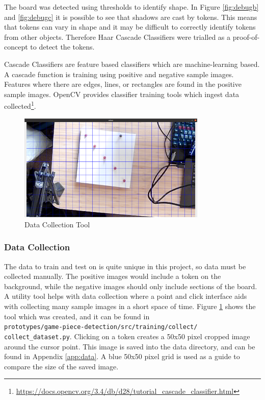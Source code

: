 \documentclass[12pt]{article}
\begin{document}
The board was detected using thresholds to identify shape. 
In Figure \ref{fig:debugb} and \ref{fig:debugc} it is possible to see that shadows are cast by tokens. 
This means that tokens can vary in shape and it may be difficult to correctly identify tokens from other objects. 
Therefore Haar Cascade Classifiers were trialled as a proof-of-concept to detect the tokens. 

Cascade Classifiers are feature based classifiers which are machine-learning based. 
A cascade function is training using positive and negative sample images. 
Features where there are edges, lines, or rectangles are found in the positive sample images. 
OpenCV provides classifier training tools which ingest data collected\footnote{\url{https://docs.opencv.org/3.4/db/d28/tutorial_cascade_classifier.html}}.

\begin{figure}[h]
    \centering
    \includegraphics[width=0.8\textwidth]{images/figures/fig11}
    \caption{Data Collection Tool}
    \label{fig:collect}
\end{figure}

\subsubsection{Data Collection}
The data to train and test on is quite unique in this project, so data must be collected manually. 
The positive images would include a token on the background, while the negative images should only include sections of the board. 
A utility tool helps with data collection where a point and click interface aids with collecting many sample images in a short space of time. 
Figure \ref{fig:collect} shows the tool which was created, and it can be found in\\
\texttt{prototypes/game-piece-detection/src/training/collect/\\collect\_dataset.py}. 
Clicking on a token creates a 50x50 pixel cropped image around the cursor point. 
This image is saved into the data directory, and can be found in Appendix \ref{app:data}.
A blue 50x50 pixel grid is used as a guide to compare the size of the saved image. 
\end{document}

